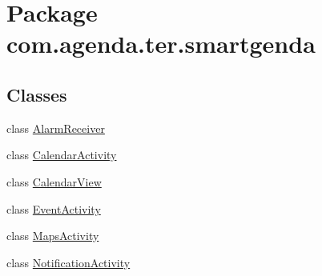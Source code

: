 \hypertarget{namespacecom_1_1agenda_1_1ter_1_1smartgenda}{\section{Package com.\-agenda.\-ter.\-smartgenda}
\label{namespacecom_1_1agenda_1_1ter_1_1smartgenda}
}
\subsection*{Classes}
\begin{DoxyCompactItemize}
\item 
class \hyperlink{classcom_1_1agenda_1_1ter_1_1smartgenda_1_1_alarm_receiver}{Alarm\-Receiver}
\item 
class \hyperlink{classcom_1_1agenda_1_1ter_1_1smartgenda_1_1_calendar_activity}{Calendar\-Activity}
\item 
class \hyperlink{classcom_1_1agenda_1_1ter_1_1smartgenda_1_1_calendar_view}{Calendar\-View}
\item 
class \hyperlink{classcom_1_1agenda_1_1ter_1_1smartgenda_1_1_event_activity}{Event\-Activity}
\item 
class \hyperlink{classcom_1_1agenda_1_1ter_1_1smartgenda_1_1_maps_activity}{Maps\-Activity}
\item 
class \hyperlink{classcom_1_1agenda_1_1ter_1_1smartgenda_1_1_notification_activity}{Notification\-Activity}
\end{DoxyCompactItemize}
